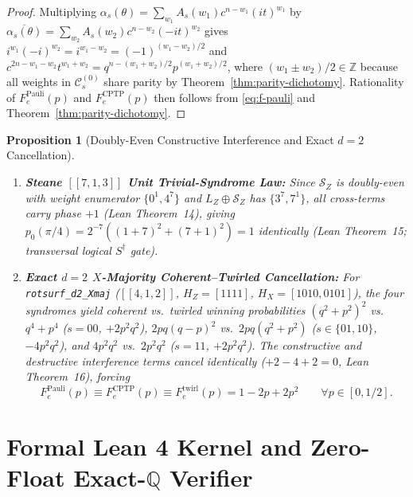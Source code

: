 \documentclass[11pt,a4paper]{article}
\theoremstyle{plain}
\newtheorem{proposition}[theorem]{Proposition}
\theoremstyle{definition}
\newcommand{\SZ}{\mathcal{S}_Z}
\begin{document}
\begin{proof}
Multiplying $\alpha_s(\theta) = \sum_{w_1} A_s(w_1) c^{n-w_1}(it)^{w_1}$ by $\overline{\alpha_s(\theta)} = \sum_{w_2} A_s(w_2) c^{n-w_2}(-it)^{w_2}$ gives $i^{w_1}(-i)^{w_2} = i^{w_1-w_2} = (-1)^{(w_1-w_2)/2}$ and $c^{2n-w_1-w_2} t^{w_1+w_2} = q^{n-(w_1+w_2)/2} p^{(w_1+w_2)/2}$, where $(w_1 \pm w_2)/2 \in \mathbb{Z}$ because all weights in $\mathcal{C}_s^{(0)}$ share parity by Theorem~\ref{thm:parity-dichotomy}. Rationality of $F_e^{\mathrm{Pauli}}(p)$ and $F_e^{\mathrm{CPTP}}(p)$ then follows from \eqref{eq:f-pauli} and Theorem~\ref{thm:parity-dichotomy}.
\end{proof}

\begin{proposition}[Doubly-Even Constructive Interference and Exact $d=2$ Cancellation]
\label{prop:special-phenomena}
\leavevmode
\begin{enumerate}[label=(\alph*),leftmargin=1.8em,itemsep=2pt]
  \item \textbf{Steane $[[7,1,3]]$ Unit Trivial-Syndrome Law:} Since $\SZ$ is doubly-even with weight enumerator $\{0^1, 4^7\}$ and $L_Z \oplus \SZ$ has $\{3^7, 7^1\}$, all cross-terms carry phase $+1$ (Lean Theorem~14), giving $p_0(\pi/4) = 2^{-7}((1+7)^2 + (7+1)^2) = 1$ identically (Lean Theorem~15; transversal logical $S^\dagger$ gate).
  \item \textbf{Exact $d=2$ $X$-Majority Coherent--Twirled Cancellation:} For \texttt{rotsurf\_d2\_Xmaj} ($[[4,1,2]]$, $H_Z = [1111]$, $H_X = [1010, 0101]$), the four syndromes yield coherent vs.\ twirled winning probabilities $(q^2+p^2)^2$ vs.\ $q^4+p^4$ ($s=00$, $+2p^2q^2$), $2pq(q-p)^2$ vs.\ $2pq(q^2+p^2)$ ($s \in \{01,10\}$, $-4p^2q^2$), and $4p^2q^2$ vs.\ $2p^2q^2$ ($s=11$, $+2p^2q^2$). The constructive and destructive interference terms cancel identically ($+2-4+2 = 0$, Lean Theorem~16), forcing
  \begin{equation}
    F_e^{\mathrm{Pauli}}(p) \equiv F_e^{\mathrm{CPTP}}(p) \equiv F_e^{\mathrm{twirl}}(p) = 1 - 2p + 2p^2 \qquad \forall p \in [0, 1/2].
  \end{equation}
\end{enumerate}
\end{proposition}

\section{Formal Lean 4 Kernel and Zero-Float Exact-\texorpdfstring{$\mathbb{Q}$}{Q} Verifier}
\end{document}
